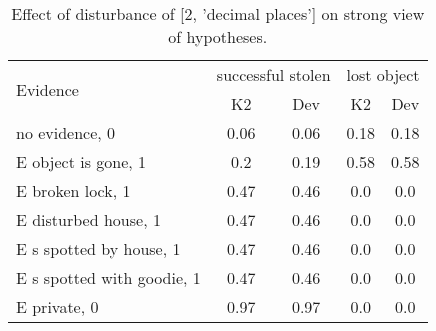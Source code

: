 \begin{table}\begin{tabular}{l|cc|cc}\toprule\multirow{2}{*}{Evidence} & \multicolumn{2}{c}{successful stolen}& \multicolumn{2}{c}{lost object}\\& {K2} & {Dev}& {K2} & {Dev}\\\midrule
no evidence, 0 & 0.06&0.06&0.18&0.18\\E object is gone, 1 & 0.2&0.19&0.58&0.58\\E broken lock, 1 & 0.47&0.46&0.0&0.0\\E disturbed house, 1 & 0.47&0.46&0.0&0.0\\E s spotted by house, 1 & 0.47&0.46&0.0&0.0\\E s spotted with goodie, 1 & 0.47&0.46&0.0&0.0\\E private, 0 & 0.97&0.97&0.0&0.0\\\bottomrule\end{tabular}\caption{Effect of disturbance of [2, 'decimal places'] on strong view of hypotheses.}\end{table}